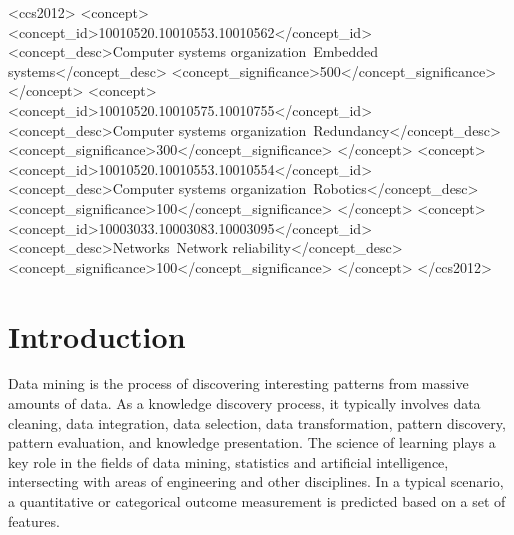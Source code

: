 \documentclass{sig-alternate-05-2015}
\begin{document}
%
%
\begin{CCSXML}
<ccs2012>
 <concept>
  <concept_id>10010520.10010553.10010562</concept_id>
  <concept_desc>Computer systems organization~Embedded systems</concept_desc>
  <concept_significance>500</concept_significance>
 </concept>
 <concept>
  <concept_id>10010520.10010575.10010755</concept_id>
  <concept_desc>Computer systems organization~Redundancy</concept_desc>
  <concept_significance>300</concept_significance>
 </concept>
 <concept>
  <concept_id>10010520.10010553.10010554</concept_id>
  <concept_desc>Computer systems organization~Robotics</concept_desc>
  <concept_significance>100</concept_significance>
 </concept>
 <concept>
  <concept_id>10003033.10003083.10003095</concept_id>
  <concept_desc>Networks~Network reliability</concept_desc>
  <concept_significance>100</concept_significance>
 </concept>
</ccs2012>  
\end{CCSXML}



%
%

%
%
\printccsdesc



\section{Introduction}
Data mining is the process of discovering interesting patterns from massive amounts of data. As a knowledge discovery process, it typically involves data cleaning, data integration, data selection, data transformation, pattern discovery, pattern evaluation, and knowledge presentation\cite{data mining}. The science of learning plays a key role in the fields of data mining, statistics and artificial intelligence, intersecting with areas of engineering and other disciplines\cite{statistical}.  In a typical scenario, a quantitative or categorical outcome measurement is predicted based on a set of features.
\end{document}
